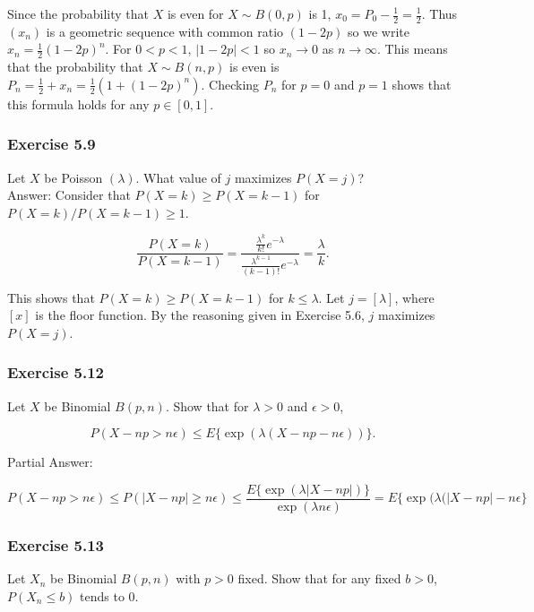 \documentclass{article}
\begin{document}
{Since the probability that $X$ is even for $X \sim B(0,p)$ is 1, $x_0 = P_0 - \frac{1}{2} = \frac{1}{2}$. Thus $(x_n)$ is a geometric sequence with common ratio $(1-2p)$ so we write $x_n = \frac{1}{2}(1-2p)^n$. For $0<p<1$, $|1-2p| < 1$ so $x_n \rightarrow 0$ as $n \rightarrow \infty$. This means that the probability that $X \sim B(n,p)$ is even is $P_n = \frac{1}{2} + x_n = \frac{1}{2}(1 +(1-2p)^n)$. Checking $P_n$ for $p = 0$ and $p=1$ shows that this formula holds for any $p \in [0,1]$. 

\subsubsection*{Exercise 5.9}

Let $X$ be Poisson $(\lambda)$. What value of $j$ maximizes $P(X = j)$?\\

Answer: Consider that $P(X = k) \geq P(X = k-1)$ for $P(X = k) / P(X = k-1) \geq 1$. 

$$
\frac{P(X = k)}{P(X = k-1)} = \frac{\frac{\lambda^k}{k!}e^{-\lambda}}{\frac{\lambda^{k-1}}{(k-1)!}e^{-\lambda}} = \frac{\lambda}{k}.
$$

This shows that $P(X = k) \geq P(X = k-1)$ for $k \leq \lambda$. Let $j = [\lambda]$, where $[x]$ is the floor function. By the reasoning given in Exercise 5.6, $j$ maximizes $P(X = j)$. 

\subsubsection*{Exercise 5.12}

Let $X$ be Binomial $B(p, n)$. Show that for $\lambda > 0$ and $\epsilon > 0$,

$$
P(X - np > n\epsilon) \leq E\{\exp(\lambda(X - np - n\epsilon))\}.
$$

Partial Answer:

$$
P(X - np > n\epsilon) \leq P(|X - np| \geq n\epsilon)
\leq \frac{E\{\exp(\lambda|X - np|)\}}{\exp(\lambda n\epsilon)}
= E\{\exp(\lambda(|X - np| -n\epsilon \}
$$


\subsubsection*{Exercise 5.13}

Let $X_n$ be Binomial $B(p, n)$ with $p > 0$ fixed. Show that for any fixed $b > 0$, $P(X_n \leq b)$ tends to 0.\\


}
\end{document}

